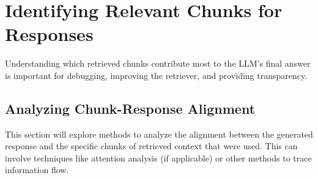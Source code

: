 \chapter{Identifying Relevant Chunks for Responses}
\label{chap:relevant_chunks}

Understanding which retrieved chunks contribute most to the LLM's final answer is important for debugging, improving the retriever, and providing transparency.

\section{Analyzing Chunk-Response Alignment}
This section will explore methods to analyze the alignment between the generated response and the specific chunks of retrieved context that were used. This can involve techniques like attention analysis (if applicable) or other methods to trace information flow.